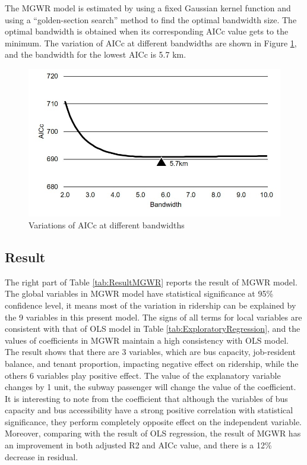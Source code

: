 \documentclass[utf8]{article}
\begin{document}
%
The MGWR model is estimated by using a fixed Gaussian kernel function and using a “golden-section search” method to find the optimal bandwidth size. The optimal bandwidth is obtained when its corresponding AICc value gets to the minimum. The variation of AICc at different bandwidths are shown in Figure \ref{fig:AICcBandwidths}, and the bandwidth for the lowest AICc is 5.7 km.

\begin{figure}[htbp]
	\centering
	\includegraphics[scale=0.5]{AICcBandwidths}
	\caption{Variations of AICc at different bandwidths}
	\label{fig:AICcBandwidths}
\end{figure}

%
\subsection{Result}
\indent

The right part of Table \ref{tab:ResultMGWR} reports the result of MGWR model. The global variables in MGWR model have statistical significance at 95\% confidence level, it means most of the variation in ridership can be explained by the 9 variables in this present model. The signs of all terms for local variables are consistent with that of OLS model in Table \ref{tab:ExploratoryRegression}, and the values of coefficients in MGWR maintain a high consistency with OLS model. The result shows that there are 3 variables, which are bus capacity, job-resident balance, and tenant proportion, impacting negative effect on ridership, while the others 6 variables play positive effect. The value of the explanatory variable changes by 1 unit, the subway passenger will change the value of the coefficient. It is interesting to note from the coefficient that although the variables of bus capacity and bus accessibility have a strong positive correlation with statistical significance, they perform completely opposite effect on the independent variable. Moreover, comparing with the result of OLS regression, the result of MGWR has an improvement in both adjusted R2 and AICc value, and there is a 12\% decrease in residual.
\end{document}
